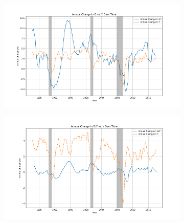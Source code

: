 \documentclass{article}
\begin{document}
\begin{figure}[H!]
\centering
\begin{subfigure}{0.45\textwidth}
  \centering
  \includegraphics[width=\linewidth]{D_annual_change_vs_Y.png}
\end{subfigure}%
\hspace{0.05\textwidth} %
\begin{subfigure}{0.45\textwidth}
  \centering
  \includegraphics[width=\linewidth]{D_Y_annual_change_vs_Y.png}
\end{subfigure}

\vspace{1em} %


\end{figure}
\end{document}
